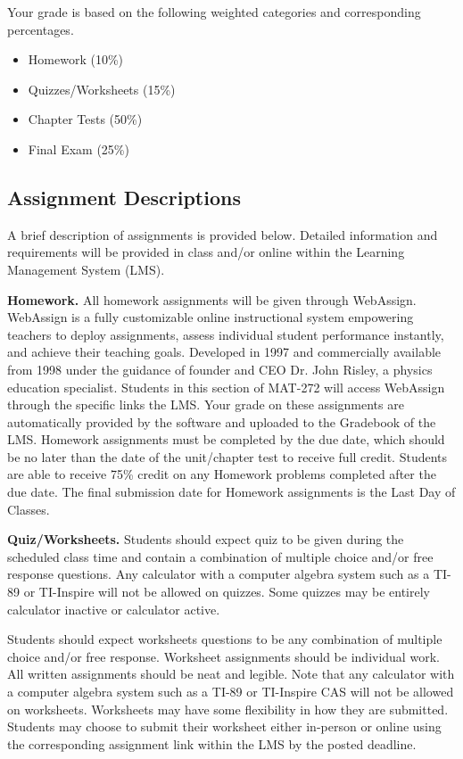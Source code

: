 \documentclass[11pt]{article}
\begin{document}
Your grade is based on the following weighted categories and corresponding percentages.

\begin{itemize}
\item Homework (10\%)
\item Quizzes/Worksheets (15\%)
\item Chapter Tests (50\%)
\item Final Exam (25\%)
\end{itemize}

\subsection{Assignment Descriptions}

A brief description of assignments is provided below. Detailed information and requirements will be provided in class and/or online within the Learning Management System (LMS).

\textbf{Homework.} All homework assignments will be given through WebAssign. WebAssign is a fully customizable online instructional system empowering teachers to deploy assignments, assess individual student performance instantly, and achieve their teaching goals. Developed in 1997 and commercially available from 1998 under the guidance of founder and CEO Dr. John Risley, a physics education specialist. Students in this section of MAT-272 will access WebAssign through the specific links the LMS. Your grade on these assignments are automatically provided by the software and uploaded to the Gradebook of the LMS. Homework assignments must be completed by the due date, which should be no later than the date of the unit/chapter test to receive full credit. Students are able to receive 75\% credit on any Homework problems completed after the due date. The final submission date for Homework assignments is the Last Day of Classes.

\textbf{Quiz/Worksheets.} Students should expect quiz to be given during the scheduled class time and contain a combination of multiple choice and/or free response questions. Any calculator with a computer algebra system such as a TI-89 or TI-Inspire will not be allowed on quizzes. Some quizzes may be entirely calculator inactive or calculator active.

Students should expect worksheets questions to be any combination of multiple choice and/or free response. Worksheet assignments should be individual work. All written assignments should be neat and legible. Note that any calculator with a computer algebra system such as a TI-89 or TI-Inspire CAS will not be allowed on worksheets. Worksheets may have some flexibility in how they are submitted. Students may choose to submit their worksheet either in-person or online using the corresponding assignment link within the LMS by the posted deadline.
\end{document}
